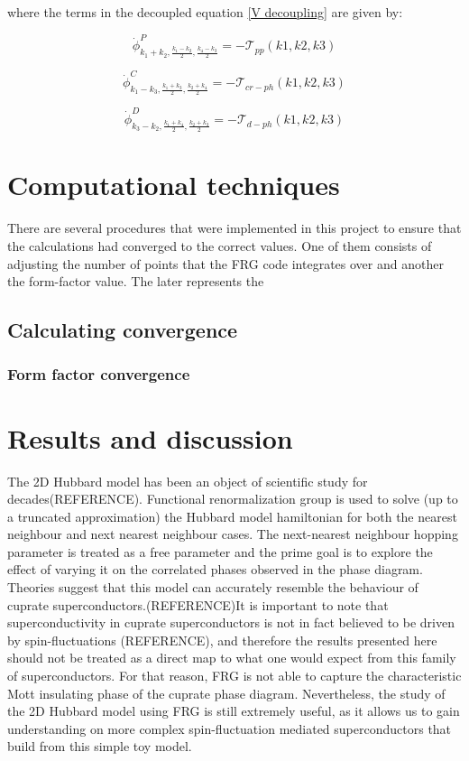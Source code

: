 \documentclass[12pt]{article}
\begin{document}
where the terms in the decoupled equation \eqref{V decoupling} are given by:

\begin{equation}
    \dot{\phi}^{P}_{k_1 +k_2, \frac{k_1 - k_2}{2}, \frac{k_4-k_3}{2}} = - \mathcal{T}_{pp}(k1,k2,k3)
\end{equation}


\begin{equation}
    \dot{\phi}^{C}_{k_1 - k_3, \frac{k_1 +k_3}{2}, \frac{k_2+k_4}{2}} = - \mathcal{T}_{cr-ph}(k1,k2,k3)
\end{equation}

\begin{equation}
    \dot{\phi}^{D}_{k_3- k_2, \frac{k_1 + k_4}{2}, \frac{k_2+k_3}{2}} = - \mathcal{T}_{d-ph}(k1,k2,k3)
\end{equation}


\section{Computational techniques}

There are several procedures that were implemented in this project to ensure that the calculations had converged to the correct values. One of them consists of adjusting the number of points that the FRG code integrates over and another the form-factor value. The later represents the 

\subsection{Calculating convergence}

\subsubsection{Form factor convergence}

\section{Results and discussion}

The 2D Hubbard model has been an object of scientific study for decades(REFERENCE).
Functional renormalization group is used to solve (up to a truncated approximation) the Hubbard model hamiltonian for both the nearest neighbour and next nearest neighbour cases. The next-nearest neighbour hopping parameter is treated as a free parameter and the prime goal is to explore the effect of varying it on the correlated phases observed in the phase diagram.
Theories suggest that this model can accurately resemble the behaviour of cuprate superconductors.(REFERENCE)It is important to note that superconductivity in cuprate superconductors is not in fact believed to be driven by spin-fluctuations (REFERENCE),  and therefore the results presented here should not be treated as a direct map to what one would expect from this family of superconductors. For that reason, FRG is not able to capture the characteristic Mott insulating phase of the cuprate phase diagram.
Nevertheless, the study of the 2D Hubbard model using FRG is still extremely useful, as it allows us to gain understanding on more complex spin-fluctuation mediated superconductors that build from this simple toy model. 
\end{document}

